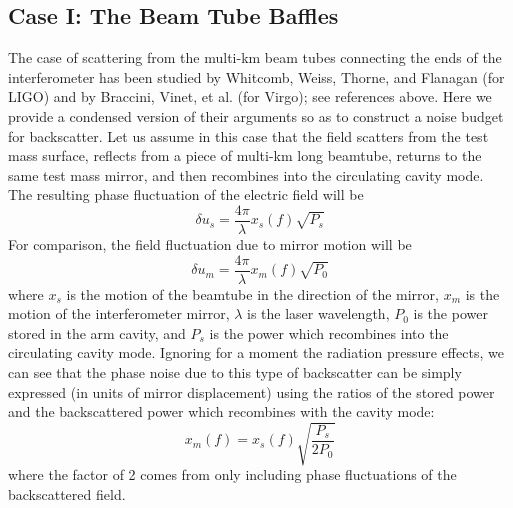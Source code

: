 \subsection{Case I: The Beam Tube Baffles}
The case of scattering from the multi-km beam tubes connecting the ends of the
interferometer has been studied by Whitcomb, Weiss, Thorne, and Flanagan (for LIGO)
and by Braccini, Vinet, et al. (for Virgo); see references above. Here we provide
a condensed version of their arguments so as to construct a noise budget for backscatter.
Let us assume in this case that the field scatters from the test mass surface,
reflects from a piece of multi-km long beamtube, returns to the same test mass
mirror, and then recombines into the circulating cavity mode. The resulting
phase fluctuation of the electric field will be
\begin{equation}
\delta u_{s} = \frac{4 \pi}{\lambda} x_{s}(f) \sqrt{P_s}
\end{equation}
For comparison, the field fluctuation due to mirror motion will be
\begin{equation}
\delta u_{m} = \frac{4 \pi}{\lambda} x_{m}(f) \sqrt{P_0}
\end{equation}
where $x_s$ is the motion of the beamtube in the direction of the mirror, $x_m$
is the motion of the interferometer mirror, $\lambda$ is the laser wavelength,
$P_0$ is the power stored in the arm cavity, and $P_s$ is the power which
recombines into the circulating cavity mode. Ignoring for a moment the radiation
pressure effects, we can see that the phase noise due to this type of backscatter
can be simply expressed (in units of mirror displacement) using the ratios of
the stored power and the backscattered power which recombines with the cavity mode:
\begin{equation}
x_{m}(f) = x_{s}(f) \sqrt{\frac{P_s}{2 P_0}}
\end{equation}
where the factor of 2 comes from only including phase fluctuations of the backscattered field.

